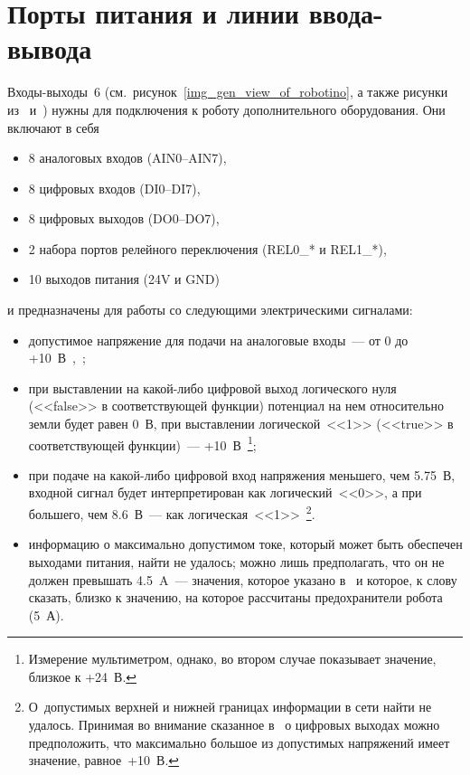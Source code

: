 \section{Порты питания и линии ввода-вывода}
Входы-выходы~6 (см.~рисунок~\ref{img_gen_view_of_robotino}, а также рисунки из~\cite[стр.~74]{main_manual} и~\cite{docs_page_analog}) нужны для подключения к роботу дополнительного оборудования.
Они включают в себя
\begin{itemize}
    \item 8 аналоговых входов (AIN0--AIN7),
    \item 8 цифровых входов (DI0--DI7),
    \item 8 цифровых выходов (DO0--DO7),
    \item 2 набора портов релейного переключения (REL0\_* и REL1\_*),
    \item 10 выходов питания (24V и GND)
\end{itemize}
и предназначены для работы со следующими электрическими сигналами:
\begin{itemize}
    \item допустимое напряжение для подачи на аналоговые входы~--- от 0 до +10~В~\cite[стр.~74]{main_manual},~\cite{docs_page_analog};
    \item при выставлении на какой-либо цифровой выход логического нуля (<<false>> в соответствующей функции) потенциал на нем относительно земли будет равен 0~В, при выставлении логической~<<1>> (<<true>> в соответствующей функции)~--- +10~В~\cite{docs_page_digit_out}\footnote{Измерение мультиметром, однако, во втором случае показывает значение, близкое к +24~В.};
    \item при подаче на какой-либо цифровой вход напряжения меньшего, чем 5.75~В, входной сигнал будет интерпретирован как логический~<<0>>, а при большего, чем 8.6~В~--- как логическая~<<1>>~\cite{docs_page_digit_in}\footnote{О~допустимых верхней и нижней границах информации в сети найти не удалось. Принимая во внимание сказанное в~\cite{docs_page_digit_out} о цифровых выходах можно предположить, что максимально большое из допустимых напряжений имеет значение, равное~+10~В.}.
    \item информацию о максимально допустимом токе, который может быть обеспечен выходами питания, найти не удалось; можно лишь предполагать, что он не должен превышать 4.5~A~--- значения, которое указано в~\cite[стр.~58]{main_manual} и которое, к слову сказать, близко к значению, на которое рассчитаны предохранители робота (5~А).
\end{itemize}

